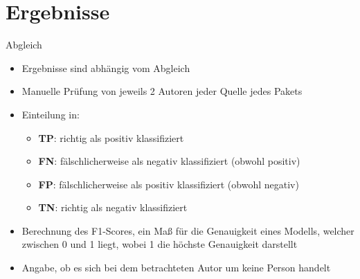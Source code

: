\documentclass[%
    handout,
    aspectratio=1610,
    10pt,
    onlytextwidth, %
]{beamer}
\begin{document}
\section{Ergebnisse}

\begin{frame}{Abgleich}
    \begin{itemize}
        \item Ergebnisse sind abhängig vom Abgleich %
        \item Manuelle Prüfung von jeweils 2 Autoren jeder Quelle jedes Pakets
        \item Einteilung in:
        \begin{itemize}
            \item \textcolor{links}{\textbf{TP}}: richtig als positiv klassifiziert
            \item \textcolor{links}{\textbf{FN}}: fälschlicherweise als negativ klassifiziert (obwohl positiv)
            \item \textcolor{links}{\textbf{FP}}: fälschlicherweise als positiv klassifiziert (obwohl negativ)
            \item \textcolor{links}{\textbf{TN}}: richtig als negativ klassifiziert
        \end{itemize}
        \item Berechnung des F1-Scores, ein Maß für die Genauigkeit eines Modells, welcher zwischen 0 und 1 liegt, wobei 1 die höchste Genauigkeit darstellt
        \item Angabe, ob es sich bei dem betrachteten Autor um keine Person handelt
    \end{itemize}
\end{frame}
\end{document}
